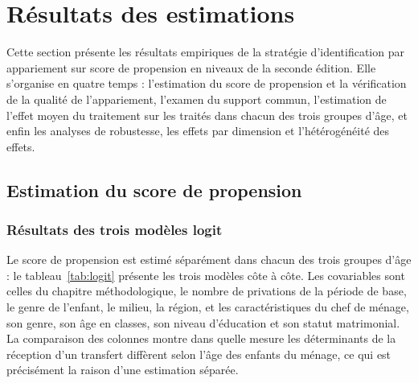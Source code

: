\section{Résultats des estimations}
\label{sec:resultats}

Cette section présente les résultats empiriques de la stratégie
d'identification par appariement sur score de propension en niveaux de la
seconde édition. Elle s'organise en quatre temps : l'estimation du score de
propension et la vérification de la qualité de l'appariement, l'examen du
support commun, l'estimation de l'effet moyen du traitement sur les traités
dans chacun des trois groupes d'âge, et enfin les analyses de robustesse,
les effets par dimension et l'hétérogénéité des effets.

\subsection{Estimation du score de propension}

\subsubsection{Résultats des trois modèles logit}

Le score de propension est estimé séparément dans chacun des trois groupes
d'âge : le tableau~\ref{tab:logit} présente les trois modèles côte à côte.
Les covariables sont celles du chapitre méthodologique, le nombre de
privations de la période de base, le genre de l'enfant, le milieu, la
région, et les caractéristiques du chef de ménage, son genre, son âge en
classes, son niveau d'éducation et son statut matrimonial. La comparaison
des colonnes montre dans quelle mesure les déterminants de la réception
d'un transfert diffèrent selon l'âge des enfants du ménage, ce qui est
précisément la raison d'une estimation séparée.

